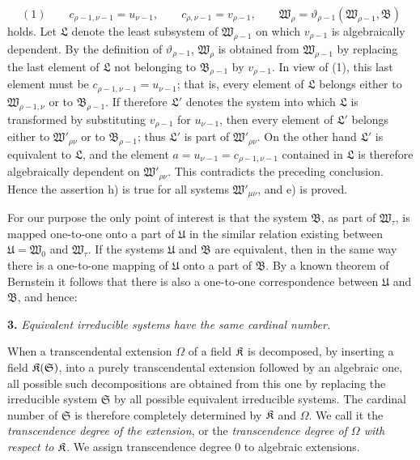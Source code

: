 \[
(1)\qquad c_{\rho-1,\nu-1}=u_{\nu-1},\qquad
c_{\rho,\nu-1}=v_{\rho-1},
\qquad
\mathfrak W_\rho=\vartheta_{\rho-1}(\mathfrak W_{\rho-1},\mathfrak B)
\]
holds. Let \(\mathfrak L\) denote the least subsystem of \(\mathfrak W_{\rho-1}\) on which \(v_{\rho-1}\) is algebraically dependent. By the definition of \(\vartheta_{\rho-1}\), \(\mathfrak W_\rho\) is obtained from \(\mathfrak W_{\rho-1}\) by replacing the last element of \(\mathfrak L\) not belonging to \(\mathfrak B_{\rho-1}\) by \(v_{\rho-1}\). In view of (1), this last element must be \(c_{\rho-1,\nu-1}=u_{\nu-1}\); that is, every element of \(\mathfrak L\) belongs either to \(\mathfrak W_{\rho-1,\nu}\) or to \(\mathfrak B_{\rho-1}\). If therefore \(\mathfrak L'\) denotes the system into which \(\mathfrak L\) is transformed by substituting \(v_{\rho-1}\) for \(u_{\nu-1}\), then every element of \(\mathfrak L'\) belongs either to \(\mathfrak W'_{\rho\nu}\) or to \(\mathfrak B_{\rho-1}\); thus \(\mathfrak L'\) is part of \(\mathfrak W'_{\rho\nu}\). On the other hand \(\mathfrak L'\) is equivalent to \(\mathfrak L\), and the element \(a=u_{\nu-1}=c_{\rho-1,\nu-1}\) contained in \(\mathfrak L\) is therefore algebraically dependent on \(\mathfrak W'_{\rho\nu}\). This contradicts the preceding conclusion. Hence the assertion h) is true for all systems \(\mathfrak W'_{\mu\nu}\), and e) is proved.

For our purpose the only point of interest is that the system \(\mathfrak B\), as part of \(\mathfrak W_\tau\), is mapped one-to-one onto a part of \(\mathfrak U\) in the similar relation existing between \(\mathfrak U=\mathfrak W_0\) and \(\mathfrak W_\tau\). If the systems \(\mathfrak U\) and \(\mathfrak B\) are equivalent, then in the same way there is a one-to-one mapping of \(\mathfrak U\) onto a part of \(\mathfrak B\). By a known theorem of Bernstein it follows that there is also a one-to-one correspondence between \(\mathfrak U\) and \(\mathfrak B\), and hence:

\textbf{3.} \emph{Equivalent irreducible systems have the same cardinal number.}

When a transcendental extension \(\Omega\) of a field \(\mathfrak K\) is decomposed, by inserting a field \(\mathfrak K(\mathfrak S)\), into a purely transcendental extension followed by an algebraic one, all possible such decompositions are obtained from this one by replacing the irreducible system \(\mathfrak S\) by all possible equivalent irreducible systems. The cardinal number of \(\mathfrak S\) is therefore completely determined by \(\mathfrak K\) and \(\Omega\). We call it the \emph{transcendence degree of the extension}, or the \emph{transcendence degree of \(\Omega\) with respect to \(\mathfrak K\)}. We assign transcendence degree 0 to algebraic extensions.

